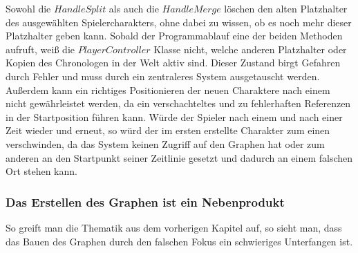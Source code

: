 Sowohl die $HandleSplit$ als auch die $HandleMerge$ löschen den alten Platzhalter des ausgewählten Spielercharakters, ohne dabei zu wissen, ob es noch mehr dieser Platzhalter geben kann. Sobald der Programmablauf eine der beiden Methoden aufruft, weiß die $PlayerController$ Klasse nicht, welche anderen Platzhalter oder Kopien des Chronologen in der Welt aktiv sind. Dieser Zustand birgt Gefahren durch Fehler und muss durch ein zentraleres System ausgetauscht werden. Außerdem kann ein richtiges Positionieren der neuen Charaktere nach einem  nicht gewährleistet werden, da ein verschachteltes  und  zu fehlerhaften Referenzen in der Startposition führen kann. Würde der Spieler nach einem   und nach einer Zeit wieder  und erneut,  so würd der im ersten  erstellte Charakter zum einen verschwinden, da das System keinen Zugriff auf den Graphen hat oder zum anderen an den Startpunkt seiner Zeitlinie gesetzt und dadurch an einem falschen Ort stehen kann.

\subsubsection{Das Erstellen des Graphen ist ein Nebenprodukt}
So greift man die Thematik aus dem vorherigen Kapitel auf, so sieht man, dass das Bauen des Graphen durch den falschen Fokus ein schwieriges Unterfangen ist. 

